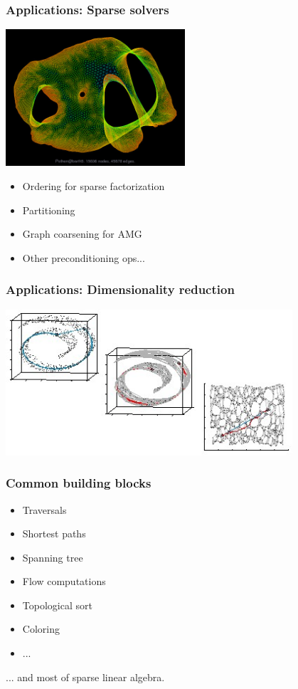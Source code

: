 \documentclass{beamer}
\begin{document}
\begin{frame}
  \frametitle{Applications: Sparse solvers}

  \begin{center}
    \href{http://yifanhu.net/GALLERY/GRAPHS/GIF_SMALL/Pothen@barth5.html}{\includegraphics[width=0.5\textwidth]{figs/Pothen-barth5.jpg}}
  \end{center}

  \begin{itemize}
  \item Ordering for sparse factorization
  \item Partitioning
  \item Graph coarsening for AMG
  \item Other preconditioning ops...
  \end{itemize}
\end{frame}

\begin{frame}
  \frametitle{Applications: Dimensionality reduction}

  \begin{center}
    \href{http://web.mit.edu/cocosci/isomap/isomap.html}{\includegraphics[width=0.8\textwidth]{figs/web1.jpg}}
  \end{center}
\end{frame}

\begin{frame}
  \frametitle{Common building blocks}

  \begin{itemize}
  \item Traversals
  \item Shortest paths
  \item Spanning tree
  \item Flow computations
  \item Topological sort
  \item Coloring
  \item ...
  \end{itemize}
  ... and most of sparse linear algebra.
\end{frame}
\end{document}
